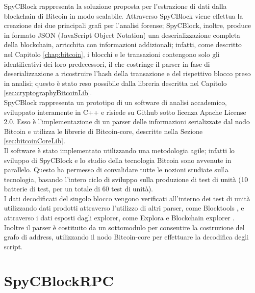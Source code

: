 SpyCBlock rappresenta la soluzione proposta per l'estrazione di dati dalla blockchain di Bitcoin in modo scalabile. Attraverso SpyCBlock viene effettua la creazione dei due principali grafi per l'analisi forense; SpyCBlock, inoltre, produce in formato JSON (JavaScript Object Notation) una deserializzazione completa della blockchain, arricchita con informazioni addizionali; infatti, come descritto nel Capitolo \ref{chap:bitcoin}, i blocchi e le transazioni contengono solo gli identificativi dei loro predecessori, il che costringe il parser in fase di deserializzazione a ricostruire l'hash della transazione e del rispettivo blocco preso in analisi; questo è stato reso possibile dalla libreria  descritta nel Capitolo \ref{sec:cryptographyBitcoinLib}.\\
SpyCBlock rappresenta un prototipo di un software di analisi accademico, sviluppato interamente in C++ e risiede su Github sotto licenza Apache License 2.0. Esso è l'implementazione di un parser delle informazioni serializzate dal nodo Bitcoin e utilizza le librerie di Bitcoin-core, descritte nella Sezione \ref{sec:bitcoinCoreLib}.\\
Il software è stato implementato utilizzando una metodologia agile; infatti lo sviluppo di SpyCBlock e lo studio della tecnologia Bitcoin sono avvenute in parallelo. Questo ha permesso di convalidare tutte le nozioni studiate sulla tecnologia, basando l'intero ciclo di sviluppo sulla produzione di test di unità (10 batterie di test, per un totale di 60 test di unità).\\
I dati decodificati del singolo blocco vengono verificati all'interno dei test di unità utilizzando dati prodotti attraverso l'utilizzo di altri parser, come Blocktools \cite{parser:blocktools}, e attraverso i dati esposti dagli explorer, come Explora \cite{blockstream:esplora} e Blockchain explorer \cite{blockchain:explorer}.\\
Inoltre il parser è costituito da un sottomodulo per consentire la costruzione del grafo di address, utilizzando il nodo Bitcoin-core per effettuare la decodifica degli script.

\section{SpyCBlockRPC} \label{sec:spycblockrpc}


